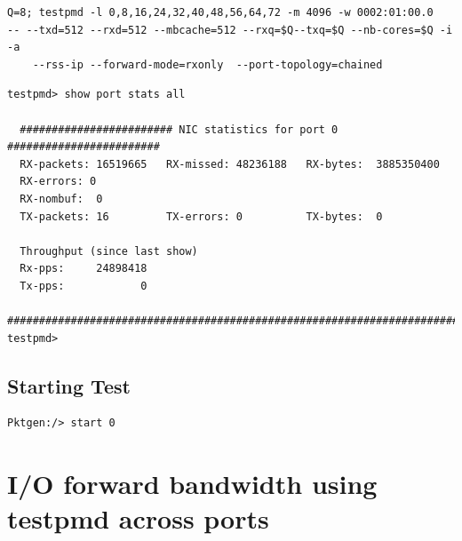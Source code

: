\documentclass[letter]{article}
\begin{document}
{\begin{lstlisting}[escapechar=!]
Q=8; testpmd -l 0,8,16,24,32,40,48,56,64,72 -m 4096 -w 0002:01:00.0 
-- --txd=512 --rxd=512 --mbcache=512 --rxq=$Q--txq=$Q --nb-cores=$Q -i -a 
	--rss-ip --forward-mode=rxonly  --port-topology=chained
\end{lstlisting}

\begin{lstlisting}
testpmd> show port stats all

  ######################## NIC statistics for port 0  ########################
  RX-packets: 16519665   RX-missed: 48236188   RX-bytes:  3885350400
  RX-errors: 0
  RX-nombuf:  0         
  TX-packets: 16         TX-errors: 0          TX-bytes:  0

  Throughput (since last show)
  Rx-pps:     24898418
  Tx-pps:            0
  ############################################################################
testpmd> 
\end{lstlisting}

\subsection{Starting Test}

\begin{lstlisting}[escapechar=!]
Pktgen:/> start 0
\end{lstlisting}

\section{I/O forward bandwidth using testpmd across ports}
{\setlength{\parindent}{0cm}

}}
\end{document}
